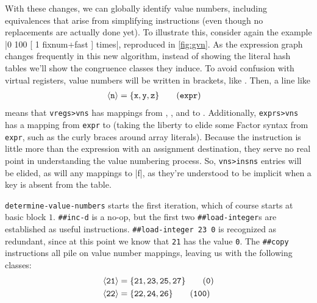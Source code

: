 With these changes, we can globally identify value numbers, including
equivalences that arise from simplifying instructions (even though no
replacements are actually done yet).  To illustrate this, consider again the
example
%
\factor|0 100 [ 1 fixnum+fast ] times|,
%
reproduced in \vref{fig:gvn}.  As the expression graph changes frequently in
this new algorithm, instead of showing the literal hash tables we'll show the
congruence classes they induce.  To avoid confusion with virtual registers,
value numbers will be written in brackets, like .  Then, a line like
%
\begin{align*}
%
  \vn{n} &= \{\vreg{x}, \vreg{y}, \vreg{z}\} \tag{\texttt{expr}}
%
\end{align*}
%
means that \Verb|vregs>vns| has mappings from , , and 
to .  Additionally, \Verb|exprs>vns| has a mapping from \texttt{expr}
to  (taking the liberty to elide some Factor syntax from \texttt{expr},
such as the curly braces around array literals).  Because the instruction is
little more than the expression with an assignment destination, they serve no
real point in understanding the value numbering process.  So, \Verb|vns>insns|
entries will be elided, as will any mappings to \factor|f|, as they're
understood to be implicit when a key is absent from the table.


\Verb|determine-value-numbers| starts the first iteration, which of course
starts at basic block $1$.  \Verb|##inc-d| is a no-op, but the first two
\Verb|##load-integer|s are established as useful instructions.
%
\Verb|##load-integer 23 0|
%
is recognized as redundant, since at this point we know that \Verb|21| has
the value \Verb|0|.  The \Verb|##copy| instructions all pile on value
number mappings, leaving us with the following classes:
%
\begin{align*}
  \vn{21} &= \{\vreg{21}, \vreg{23}, \vreg{25}, \vreg{27}\} \tag{\texttt{0}} \\
  \vn{22} &= \{\vreg{22}, \vreg{24}, \vreg{26}\}            \tag{\texttt{100}}
\end{align*}


